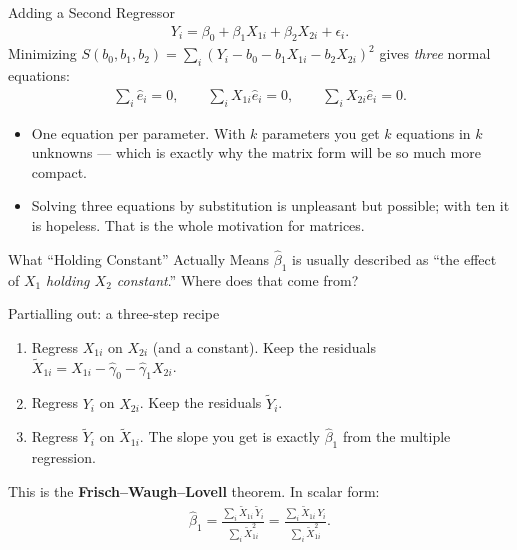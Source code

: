 \documentclass[aspectratio=169,11pt,xcolor=dvipsnames]{beamer}
\begin{document}
\begin{frame}{Adding a Second Regressor}
\begin{align*}
  Y_i = \beta_0 + \beta_1 X_{1i} + \beta_2 X_{2i} + \epsilon_i .
\end{align*}
Minimizing $S(b_0,b_1,b_2) = \sum_i (Y_i - b_0 - b_1X_{1i} - b_2X_{2i})^2$ gives
\emph{three} normal equations:
\begin{align*}
  \sum_i \hat e_i = 0, \qquad
  \sum_i X_{1i}\hat e_i = 0, \qquad
  \sum_i X_{2i}\hat e_i = 0 .
\end{align*}
\vskip4pt
\begin{itemize}
  \item One equation per parameter. With $k$ parameters you get $k$ equations in
        $k$ unknowns --- which is exactly why the matrix form will be so much
        more compact.
  \item Solving three equations by substitution is unpleasant but possible; with
        ten it is hopeless. That is the whole motivation for matrices.
\end{itemize}
\end{frame}

\begin{frame}{What ``Holding Constant'' Actually Means}
$\hat\beta_1$ is usually described as ``the effect of $X_1$ \emph{holding $X_2$
constant}.'' Where does that come from?
\vskip4pt
\begin{block}{Partialling out: a three-step recipe}
\begin{enumerate}\itemsep2pt
  \item Regress $X_{1i}$ on $X_{2i}$ (and a constant). Keep the residuals
        $\tilde X_{1i} = X_{1i} - \hat\gamma_0 - \hat\gamma_1 X_{2i}$.
  \item Regress $Y_i$ on $X_{2i}$. Keep the residuals $\tilde Y_i$.
  \item Regress $\tilde Y_i$ on $\tilde X_{1i}$. \alert{The slope you get is
        exactly $\hat\beta_1$ from the multiple regression.}
\end{enumerate}
\end{block}
\vskip2pt
This is the \textbf{Frisch--Waugh--Lovell} theorem. In scalar form:
\begin{align*}
  \hat\beta_1 = \frac{\sum_i \tilde X_{1i}\, \tilde Y_i}{\sum_i \tilde X_{1i}^2}
              = \frac{\sum_i \tilde X_{1i}\, Y_i}{\sum_i \tilde X_{1i}^2} .
\end{align*}
\end{frame}
\end{document}
